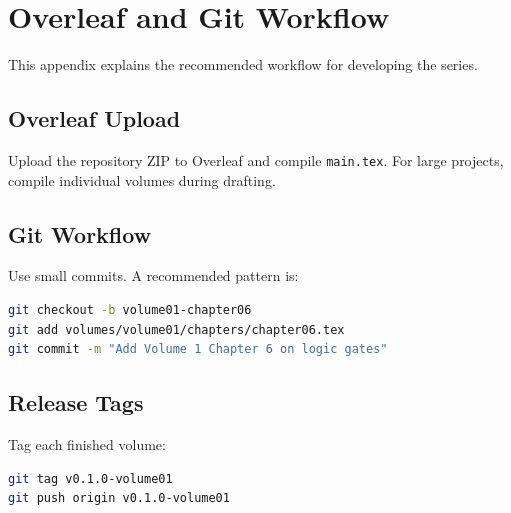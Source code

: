 
\chapter{Overleaf and Git Workflow}
\label{app:overleaf-workflow}

This appendix explains the recommended workflow for developing the series.

\section{Overleaf Upload}
Upload the repository ZIP to Overleaf and compile \texttt{main.tex}. For large projects, compile individual volumes during drafting.

\section{Git Workflow}
Use small commits. A recommended pattern is:

\begin{lstlisting}[language=bash]
git checkout -b volume01-chapter06
git add volumes/volume01/chapters/chapter06.tex
git commit -m "Add Volume 1 Chapter 6 on logic gates"
\end{lstlisting}

\section{Release Tags}
Tag each finished volume:

\begin{lstlisting}[language=bash]
git tag v0.1.0-volume01
git push origin v0.1.0-volume01
\end{lstlisting}

